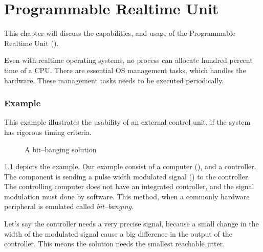 \chapter{Programmable Realtime Unit}
\label{chap:pru}

This chapter will discuss the capabilities, and usage of the Programmable Realtime Unit ().

Even with realtime operating systems, no process can allocate hundred percent time of a CPU. There are essential OS management tasks, which handles the hardware. These management tasks needs to be executed periodically.

\subsection{Example}
\label{subsec:example}

This example illustrates the usability of an external control unit, if the system has rigorous timing criteria.

\begin{figure}[h]
	\centering
	\caption{A bit--banging solution}
	\label{fig:example_pwm}
\end{figure}

\cref{fig:example_pwm} depicts the example. Our example consist of a computer (\rtos), and a controller. The \rtos component is sending a pulse width modulated signal (\pwm) to the controller. The controlling computer does not have an integrated \pwm controller, and the signal modulation must done by software. This method, when a commonly hardware peripheral is emulated called \emph{bit--banging}.

Let's say the controller needs a very precise signal, because a small change in the width of the modulated signal cause a big difference in the output of the controller. This means the solution needs the smallest reachable jitter.

